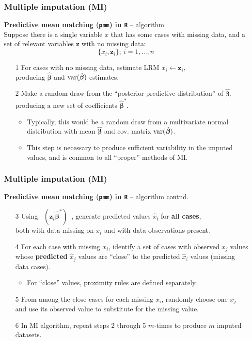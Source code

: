 \documentclass{beamer}
\begin{document}
\begin{frame}
\frametitle{Multiple imputation (MI)}
\textbf{Predictive mean matching (\texttt{pmm}) in \texttt{R}} -- algorithm\\
\medskip
Suppose there is a single variable $x$ that has some cases with missing data, and a set of relevant variables $\bm{z}$ with no missing data:
$$
\{ x_i, \bm{z}_i\};~i = 1, \dots , n
$$
\vspace{-0.5cm}
\begin{enumerate}
    \item[1] For cases with no missing data, estimate LRM $x_i \leftarrow \bm{z}_i$, \\producing $\hat{\bm{\beta}}$ and $\textnormal{var}(\hat{\bm{\beta}})$ estimates.
    \medskip
    \item[2] Make a random draw from the ``posterior predictive distribution'' of $\hat{\bm{\beta}}$, producing a new set of coefficients $\hat{\bm{\beta}}^{\ast}$.\\
    \medskip
    \begin{itemize}
        \item Typically, this would be a random draw from a multivariate normal distribution with mean $\hat{\bm{\beta}}$ and cov. matrix $\textnormal{var}(\hat{\bm{\beta}})$. \\
    \medskip 
    \item This step is necessary to produce sufficient variability in the imputed values, and is common to all ``proper'' methods of MI.
    \end{itemize}
\end{enumerate}
\end{frame}
\begin{frame}
\frametitle{Multiple imputation (MI)}
\textbf{Predictive mean matching (\texttt{pmm}) in \texttt{R}} -- algorithm contnd.\\
\bigskip
\begin{enumerate}
    \item[3] Using ~$(\bm{z}_i \hat{\bm{\beta}}^{\ast})$~, generate predicted values $\hat{x}_i$ for \textbf{all cases}, \\both with data missing on $x_i$ and with data observations present.
    \medskip
    \item[4] For each case with missing $x_i$, identify a set of cases with observed $x_j$ values whose \textbf{predicted} $\hat{x}_j$ values are ``close'' to the predicted $\hat{x}_i$ values (missing data cases).
    \medskip
    \begin{itemize}
        \item For ``close'' values, proximity rules are defined separately.
    \end{itemize}
    \medskip
    \item[5] From among the close cases for each missing $x_i$, randomly choose one $x_j$ and use its observed value to substitute for the missing value.
    \medskip
    \item[6] In MI algorithm, repeat steps 2 through 5 $m$-times to produce $m$ imputed datasets.  
\end{enumerate}
\end{frame}
\end{document}

